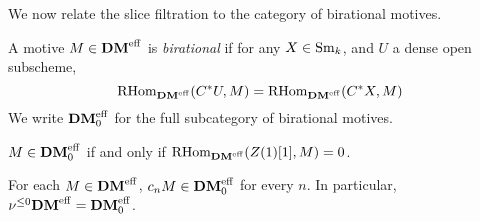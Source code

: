 We now relate the slice filtration to the category of birational
motives.

\begin{defn}
A motive $M \in \mathbf{DM}^{\mathrm{eff}}$ is \emph{birational} if for any $X \in 
\mathrm{Sm}_{k}$, and $U$ a dense open subscheme,
\[
\mathrm{RHom}_{\mathbf{DM}^{\mathrm{eff}}}(C^*U, M) = \mathrm{RHom}_{\mathbf{DM}^{\mathrm{eff}}}(C^*X, M)
\]
We write $\mathbf{DM}^{\mathrm{eff}}_0$ for the full subcategory of birational motives.
\end{defn}

\begin{prop}
$M \in \mathbf{DM}^{\mathrm{eff}}_0$ if and only if $\mathrm{RHom}_{\mathbf{DM}^{\mathrm{eff}}}(Z(1)[1], M) = 0$.
\end{prop}

\begin{prop}
For each $M \in \mathbf{DM}^{\mathrm{eff}}$, $c_{n}M \in \mathbf{DM}^{\mathrm{eff}}_0$ for every $n$.
In particular, $\nu^{\leq 0}\mathbf{DM}^{\mathrm{eff}} = \mathbf{DM}^{\mathrm{eff}}_0$.
\end{prop}
